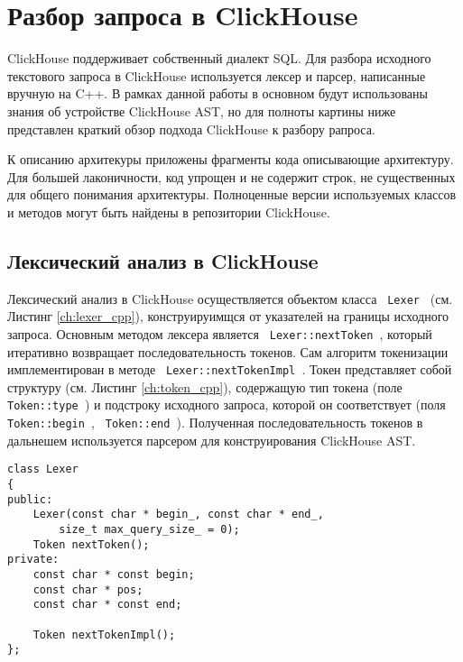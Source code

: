 \section{Разбор запроса в ClickHouse}
ClickHouse поддерживает собственный диалект SQL. Для разбора исходного текстового запроса в ClickHouse используется лексер и парсер, написанные вручную на C++. В рамках данной работы в основном будут использованы знания об устройстве ClickHouse AST, но для полноты картины ниже представлен краткий обзор подхода ClickHouse к разбору рапроса. 

К описанию архитекуры приложены фрагменты кода описывающие архитектуру. Для большей лаконичности, код упрощен и не содержит строк, не существенных для общего понимания архитектуры. Полноценные версии используемых классов и методов могут быть найдены в репозитории ClickHouse.  

\subsection{Лексический анализ в ClickHouse}

Лексический анализ в ClickHouse осуществляется объектом класса \texttt{ Lexer } (см. Листинг \ref{ch:lexer_cpp}), конструируимщся от указателей на границы исходного запроса. Основным методом лексера является \texttt{ Lexer::nextToken }, который итеративно возвращает последовательность токенов. Сам алгоритм токенизации имплементирован в методе \texttt{ Lexer::nextTokenImpl }. Токен представляет собой структуру (см. Листинг \ref{ch:token_cpp}), содержащую тип токена (поле \texttt{ Token::type }) и подстроку исходного запроса, которой он соответствует (поля \texttt{ Token::begin }, \texttt{ Token::end }). Полученная последовательность токенов в дальнешем используется парсером для конструирования ClickHouse AST.

\begin{code}
    \label{ch:lexer_cpp}
    \begin{verbatim}
class Lexer
{
public:
    Lexer(const char * begin_, const char * end_,
        size_t max_query_size_ = 0);
    Token nextToken();
private:
    const char * const begin;
    const char * pos;
    const char * const end;

    Token nextTokenImpl();
};
    \end{verbatim}
\end{code}

